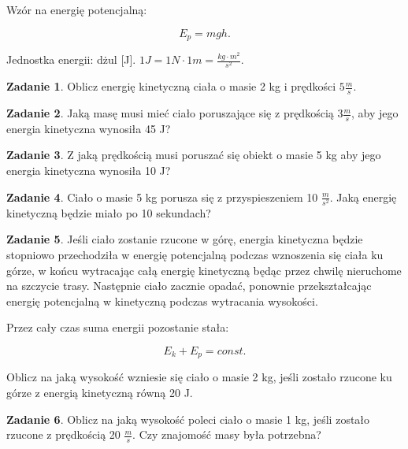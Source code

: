 \documentclass[11pt]{article}
\theoremstyle{definition}
\newtheorem{zad}{Zadanie}
\numberwithin{zad}{section}
\begin{document}
Wzór na energię potencjalną:

\begin{equation}
E_p = mgh.
\end{equation}

Jednostka energii: dżul [J]. $1 J = 1 N \cdot 1 m = \frac{kg \cdot m^2}{s^2}.$

\begin{zad}
Oblicz energię kinetyczną ciała o masie 2 kg i prędkości $5 \frac ms$.
\end{zad}

\begin{zad}
Jaką masę musi mieć ciało poruszające się z prędkością $3 \frac ms$, aby jego energia kinetyczna wynosiła 45 J?
\end{zad}

\begin{zad}
Z jaką prędkością musi poruszać się obiekt o masie 5 kg aby jego energia kinetyczna wynosiła 10 J?
\end{zad}

\begin{zad}
Ciało o masie 5 kg porusza się z przyspieszeniem 10 $\frac m{s^2}$. Jaką energię kinetyczną będzie miało po 10 sekundach?
\end{zad}

\begin{zad}
Jeśli ciało zostanie rzucone w górę, energia kinetyczna będzie stopniowo przechodziła w energię potencjalną podczas wznoszenia się ciała ku górze, w końcu wytracając całą energię kinetyczną będąc przez chwilę nieruchome na szczycie trasy. Następnie ciało zacznie opadać, ponownie przekształcając energię potencjalną w kinetyczną podczas wytracania wysokości.

Przez cały czas suma energii pozostanie stała:

\begin{equation}
E_k + E_p = const.
\end{equation}

Oblicz na jaką wysokość wzniesie się ciało o masie 2 kg, jeśli zostało rzucone ku górze z energią kinetyczną równą 20 J.
\end{zad}

\begin{zad}
Oblicz na jaką wysokość poleci ciało o masie 1 kg, jeśli zostało rzucone z prędkością 20 $\frac ms$. Czy znajomość masy była potrzebna?
\end{zad}
\end{document}
